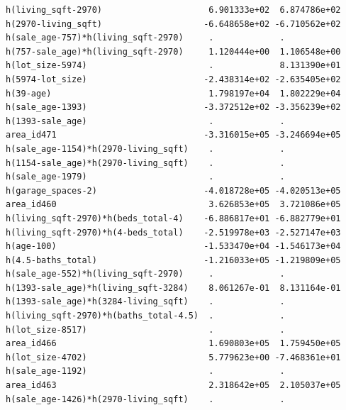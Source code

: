 \documentclass[
]{article}
\begin{document}
\begin{verbatim}
h(living_sqft-2970)                     6.901333e+02  6.874786e+02
h(2970-living_sqft)                    -6.648658e+02 -6.710562e+02
h(sale_age-757)*h(living_sqft-2970)     .             .           
h(757-sale_age)*h(living_sqft-2970)     1.120444e+00  1.106548e+00
h(lot_size-5974)                        .             8.131390e+01
h(5974-lot_size)                       -2.438314e+02 -2.635405e+02
h(39-age)                               1.798197e+04  1.802229e+04
h(sale_age-1393)                       -3.372512e+02 -3.356239e+02
h(1393-sale_age)                        .             .           
area_id471                             -3.316015e+05 -3.246694e+05
h(sale_age-1154)*h(2970-living_sqft)    .             .           
h(1154-sale_age)*h(2970-living_sqft)    .             .           
h(sale_age-1979)                        .             .           
h(garage_spaces-2)                     -4.018728e+05 -4.020513e+05
area_id460                              3.626853e+05  3.721086e+05
h(living_sqft-2970)*h(beds_total-4)    -6.886817e+01 -6.882779e+01
h(living_sqft-2970)*h(4-beds_total)    -2.519978e+03 -2.527147e+03
h(age-100)                             -1.533470e+04 -1.546173e+04
h(4.5-baths_total)                     -1.216033e+05 -1.219809e+05
h(sale_age-552)*h(living_sqft-2970)     .             .           
h(1393-sale_age)*h(living_sqft-3284)    8.061267e-01  8.131164e-01
h(1393-sale_age)*h(3284-living_sqft)    .             .           
h(living_sqft-2970)*h(baths_total-4.5)  .             .           
h(lot_size-8517)                        .             .           
area_id466                              1.690803e+05  1.759450e+05
h(lot_size-4702)                        5.779623e+00 -7.468361e+01
h(sale_age-1192)                        .             .           
area_id463                              2.318642e+05  2.105037e+05
h(sale_age-1426)*h(2970-living_sqft)    .             .           
                                                                  

\end{verbatim}
\end{document}
